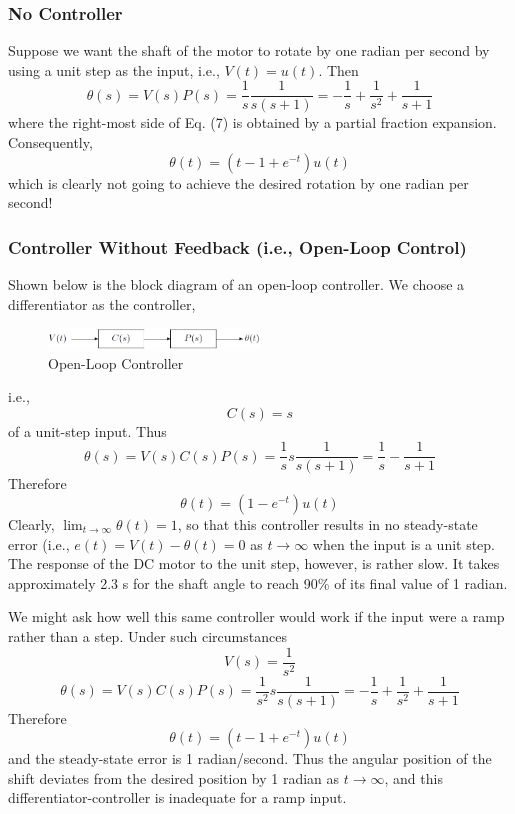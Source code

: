 \documentclass[a4paper]{article}
\begin{document}
\subsubsection{No Controller}
Suppose we want the shaft of the motor to rotate by one radian per second by using a unit step as the input, i.e., $V(t)=u(t)$. Then
\begin{equation}
    \theta(s)=V(s)P(s)=\frac{1}{s}\frac{1}{s(s+1)}=-\frac{1}{s}+\frac{1}{s^2}+\frac{1}{s+1}
\end{equation}
where the right-most side of Eq. (7) is obtained by a partial fraction expansion. Consequently,
\begin{equation}
    \theta(t)=(t-1+e^{-t})u(t)
\end{equation}
which is clearly not going to achieve the desired rotation by one radian per second!
\subsubsection{Controller Without Feedback (i.e., Open-Loop Control)}
Shown below is the block diagram of an open-loop controller. We choose a differentiator as the controller,
\begin{figure}[H]
    \begin{center}
        \includegraphics[width=0.5\textwidth]{3.png}
    \end{center}
    \caption{Open-Loop Controller}
\end{figure}
i.e.,
\begin{equation}
    C(s)=s
\end{equation}
of a unit-step input. Thus
\begin{equation}
    \theta(s)=V(s)C(s)P(s)=\frac{1}{s}s\frac{1}{s(s+1)}=\frac{1}{s}-\frac{1}{s+1}
\end{equation}
Therefore
\begin{equation}
    \theta(t)=(1-e^{-t})u(t)
\end{equation}
Clearly, $\lim_{t\rightarrow\infty}\theta(t)=1$, so that this controller results in no steady-state error (i.e., $e(t)=V(t)-\theta(t)=0$ as $t\rightarrow\infty$ when the input is a unit step. The response of the DC motor to the unit step, however, is rather slow. It takes approximately 2.3 s for the shaft angle to reach 90\% of its final value of 1 radian.

We might ask how well this same controller would work if the input were a ramp rather than a step. Under such circumstances
\begin{equation}
    V(s)=\frac{1}{s^2}
\end{equation}
\begin{equation}
    \theta(s)=V(s)C(s)P(s)=\frac{1}{s^2}s\frac{1}{s(s+1)}=-\frac{1}{s}+\frac{1}{s^2}+\frac{1}{s+1}
\end{equation}
Therefore
\begin{equation}
    \theta(t)=(t-1+e^{-t})u(t)
\end{equation}
and the steady-state error is 1 radian/second. Thus the angular position of the shift deviates from the desired position by 1 radian as $t\rightarrow\infty$, and this differentiator-controller is inadequate for a ramp input.
\end{document}
